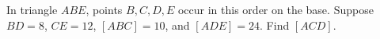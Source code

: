 In triangle $ABE$, points $B,C,D,E$ occur in this order on the base. Suppose $BD=8$, $CE=12$, $[ABC]=10$, and $[ADE]=24$. Find $[ACD]$.
